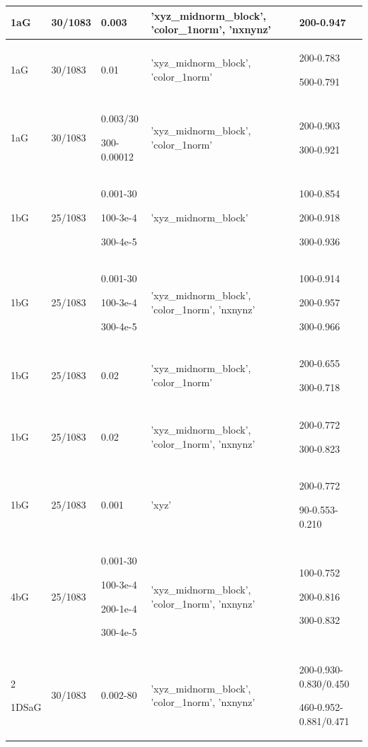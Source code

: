 \documentclass[,table,dvipsnames]{article}
\begin{document}
\begin{center}
\begin{longtable}{|p{1cm} |p{1.5cm} | p{2cm} | p{3.5cm} || p{4cm}|}
		
		\hline\hline
		1aG & 30/1083 & 0.003 & 'xyz\_midnorm\_block', 'color\_1norm', 'nxnynz'& 200-0.947  \\  [0.5ex]
		\hline		
		1aG & 30/1083 & 0.01  & 'xyz\_midnorm\_block', 'color\_1norm'& 200-0.783 \par 500-0.791  \\  [0.5ex]
		\hline		
		1aG & 30/1083 & 0.003/30 \par 300-0.00012 & 'xyz\_midnorm\_block', 'color\_1norm'& 200-0.903 \par 300-0.921  \\  [0.5ex]
		\hline\hline
		
		1bG & 25/1083 & 0.001-30 \par 100-3e-4 \par 300-4e-5 & 'xyz\_midnorm\_block'& 100-0.854 \par 200-0.918 \par 300-0.936  \\  [0.5ex]
		\hline
		1bG & 25/1083 & 0.001-30 \par 100-3e-4 \par 300-4e-5 & 'xyz\_midnorm\_block', 'color\_1norm', 'nxnynz'& 100-0.914 \par 200-0.957 \par 300-0.966  \\  [0.5ex]
		\hline	
		1bG & 25/1083 & 0.02 & 'xyz\_midnorm\_block', 'color\_1norm'& 200-0.655 \par 300-0.718  \\  [0.5ex]
		\hline
		1bG & 25/1083 & 0.02 & 'xyz\_midnorm\_block', 'color\_1norm', 'nxnynz'& 200-0.772 \par 300-0.823  \\  [0.5ex]
		\hline
		1bG & 25/1083 & 0.001 & 'xyz'& 200-0.772 \par 90-0.553-0.210  \\  [0.5ex]
		\hline \hline
		
		
		4bG & 25/1083 & 0.001-30 \par 100-3e-4 \par 200-1e-4 \par 300-4e-5& 'xyz\_midnorm\_block', 'color\_1norm', 'nxnynz'& 100-0.752 \par 200-0.816 \par 300-0.832  \\  [0.5ex] \hline2
		
		1DSaG & 30/1083 & 0.002-80 & 'xyz\_midnorm\_block', 'color\_1norm', 'nxnynz'& 200-0.930-0.830/0.450 \par 460-0.952-0.881/0.471 \\  [0.5ex] \hline
		

\end{longtable}
\end{center}
\end{document}
